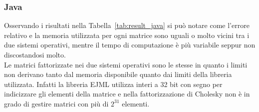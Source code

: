 \documentclass[a4paper, 12pt]{article}
\begin{document}
\subsubsection{Java}
Osservando i risultati nella Tabella~\ref{tab:result_java} si può notare come
l'errore relativo e la memoria utilizzata per ogni matrice sono uguali o molto
vicini tra i due sistemi operativi, mentre il tempo di computazione è più
variabile seppur non discostandosi molto.\\
Le matrici fattorizzate nei due sistemi operativi sono le stesse in quanto i
limiti non derivano tanto dal memoria disponibile quanto dai limiti della
libreria utilizzata. Infatti la libreria EJML utilizza interi a 32 bit con segno
per indicizzare gli elementi della matrice e nella fattorizzazione di Cholesky
non è in grado di gestire matrici con più di $2^{31}$ elementi.
\begin{table}[ht]
\centering
{}
\caption{Risultati dei benchmark Java}
\label{tab:result_java}
\end{table}
\end{document}
